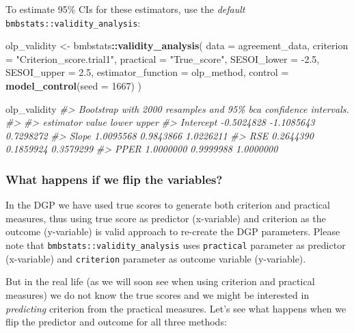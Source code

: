 \documentclass[
]{book}
\newenvironment{Shaded}{\begin{snugshade}}{\end{snugshade}}
\newcommand{\CommentTok}[1]{\textcolor[rgb]{0.56,0.35,0.01}{\textit{#1}}}
\newcommand{\DataTypeTok}[1]{\textcolor[rgb]{0.13,0.29,0.53}{#1}}
\newcommand{\DecValTok}[1]{\textcolor[rgb]{0.00,0.00,0.81}{#1}}
\newcommand{\FloatTok}[1]{\textcolor[rgb]{0.00,0.00,0.81}{#1}}
\newcommand{\KeywordTok}[1]{\textcolor[rgb]{0.13,0.29,0.53}{\textbf{#1}}}
\newcommand{\NormalTok}[1]{#1}
\newcommand{\OperatorTok}[1]{\textcolor[rgb]{0.81,0.36,0.00}{\textbf{#1}}}
\newcommand{\StringTok}[1]{\textcolor[rgb]{0.31,0.60,0.02}{#1}}
\begin{document}
To estimate 95\% CIs for these estimators, use the \emph{default} \texttt{bmbstats::validity\_analysis}:

\begin{Shaded}
\begin{Highlighting}[]
\NormalTok{olp\_validity <{-}}\StringTok{ }\NormalTok{bmbstats}\OperatorTok{::}\KeywordTok{validity\_analysis}\NormalTok{(}
  \DataTypeTok{data =}\NormalTok{ agreement\_data,}
  \DataTypeTok{criterion =} \StringTok{"Criterion\_score.trial1"}\NormalTok{,}
  \DataTypeTok{practical =} \StringTok{"True\_score"}\NormalTok{,}
  \DataTypeTok{SESOI\_lower =} \FloatTok{{-}2.5}\NormalTok{,}
  \DataTypeTok{SESOI\_upper =} \FloatTok{2.5}\NormalTok{,}
  \DataTypeTok{estimator\_function =}\NormalTok{ olp\_method,}
  \DataTypeTok{control =} \KeywordTok{model\_control}\NormalTok{(}\DataTypeTok{seed =} \DecValTok{1667}\NormalTok{)}
\NormalTok{)}

\NormalTok{olp\_validity}
\CommentTok{\#> Bootstrap with 2000 resamples and 95\% bca confidence intervals.}
\CommentTok{\#> }
\CommentTok{\#>  estimator      value      lower     upper}
\CommentTok{\#>  Intercept {-}0.5024828 {-}1.1085643 0.7298272}
\CommentTok{\#>      Slope  1.0095568  0.9843866 1.0226211}
\CommentTok{\#>        RSE  0.2644390  0.1859924 0.3579299}
\CommentTok{\#>       PPER  1.0000000  0.9999988 1.0000000}
\end{Highlighting}
\end{Shaded}

\hypertarget{what-happens-if-we-flip-the-variables}{%
\subsubsection{What happens if we flip the variables?}\label{what-happens-if-we-flip-the-variables}}

In the DGP we have used true scores to generate both criterion and practical measures, thus using true score as predictor (x-variable) and criterion as the outcome (y-variable) is valid approach to re-create the DGP parameters. Please note that \texttt{bmbstats::validity\_analysis} uses \texttt{practical} parameter as predictor (x-variable) and \texttt{criterion} parameter as outcome variable (y-variable).

But in the real life (as we will soon see when using criterion and practical measures) we do not know the true scores and we might be interested in \emph{predicting} criterion from the practical measures. Let's see what happens when we flip the predictor and outcome for all three methods:
\end{document}
